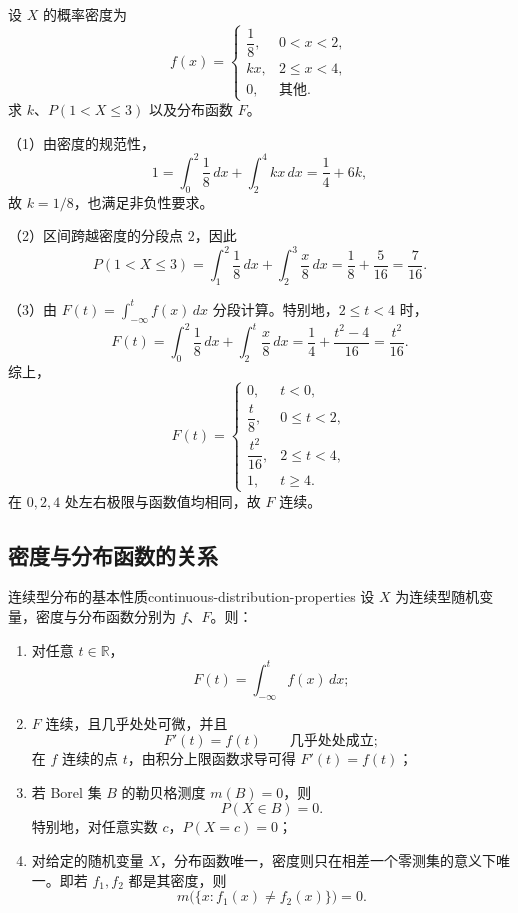 \begin{example}
设 $X$ 的概率密度为
\[
f(x)=
\begin{cases}
\dfrac18,&0<x<2,\\[0.4em]
kx,&2\leq x<4,\\
0,&\text{其他}.
\end{cases}
\]
求 $k$、$P(1<X\leq3)$ 以及分布函数 $F$。

（1）由密度的规范性，
\[
1=\int_0^2\frac18\,dx+\int_2^4kx\,dx
=\frac14+6k,
\]
故 $k=1/8$，也满足非负性要求。

（2）区间跨越密度的分段点 $2$，因此
\[
P(1<X\leq3)
=\int_1^2\frac18\,dx+\int_2^3\frac{x}{8}\,dx
=\frac18+\frac5{16}=\frac7{16}.
\]

（3）由 $F(t)=\int_{-\infty}^t f(x)\,dx$ 分段计算。特别地，$2\leq t<4$ 时，
\[
F(t)=\int_0^2\frac18\,dx+\int_2^t\frac{x}{8}\,dx
=\frac14+\frac{t^2-4}{16}=\frac{t^2}{16}.
\]
综上，
\[
F(t)=
\begin{cases}
0,&t<0,\\[0.3em]
\dfrac t8,&0\leq t<2,\\[0.5em]
\dfrac{t^2}{16},&2\leq t<4,\\[0.5em]
1,&t\geq4.
\end{cases}
\]
在 $0,2,4$ 处左右极限与函数值均相同，故 $F$ 连续。
\end{example}

\subsection*{密度与分布函数的关系}

\begin{proposition}{连续型分布的基本性质}{continuous-distribution-properties}
设 $X$ 为连续型随机变量，密度与分布函数分别为 $f$、$F$。则：
\begin{enumerate}
    \item 对任意 $t\in\mathbb R$，
    \[
    F(t)=\int_{-\infty}^t f(x)\,dx;
    \]
    \item $F$ 连续，且几乎处处可微，并且
    \[
    F'(t)=f(t)\qquad\text{几乎处处成立};
    \]
    在 $f$ 连续的点 $t$，由积分上限函数求导可得 $F'(t)=f(t)$；
    \item 若 Borel 集 $B$ 的勒贝格测度 $m(B)=0$，则
    \[
    P(X\in B)=0.
    \]
    特别地，对任意实数 $c$，$P(X=c)=0$；
    \item 对给定的随机变量 $X$，分布函数唯一，密度则只在相差一个零测集的意义下唯一。即若 $f_1,f_2$ 都是其密度，则
    \[
    m\bigl(\{x:f_1(x)\ne f_2(x)\}\bigr)=0.
    \]
\end{enumerate}
\end{proposition}

